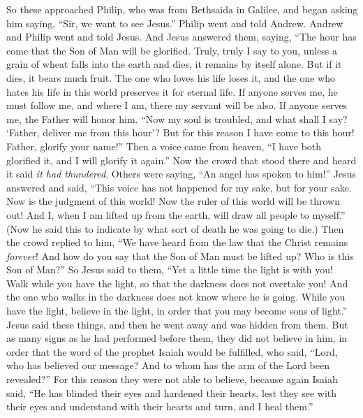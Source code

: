 \begin{biblechapter}
\verse So these approached Philip, who was from Bethsaida in Galilee, and began asking him saying, “Sir, we want to see Jesus.”
\verse Philip went and told Andrew. Andrew and Philip went and told Jesus.
\verse And Jesus answered them, saying, “The hour has come that the Son of Man will be glorified.
\verse Truly, truly I say to you, unless a grain of wheat falls into the earth and dies, it remains by itself alone. But if it dies, it bears much fruit.
\verse The one who loves his life loses it, and the one who hates his life in this world preserves it for eternal life.
\verse If anyone serves me, he must follow me, and where I am, there my servant will be also. If anyone serves me, the Father will honor him.
 “Now my soul is troubled, and what shall I say? ‘Father, deliver me from this hour’? But for this reason I have come to this hour!
\verse Father, glorify your name!” Then a voice came from heaven, “I have both glorified it, and I will glorify it again.”
\verse Now the crowd that stood there and heard it said \textit{it had thundered}. Others were saying, “An angel has spoken to him!”
\verse Jesus answered and said, “This voice has not happened for my sake, but for your sake.
\verse Now is the judgment of this world! Now the ruler of this world will be thrown out!
\verse And I, when I am lifted up from the earth, will draw all people to myself.”
\verse (Now he said this to indicate by what sort of death he was going to die.)
\verse Then the crowd replied to him, “We have heard from the law that the Christ remains \textit{forever}! And how do you say that the Son of Man must be lifted up? Who is this Son of Man?”
\verse So Jesus said to them, “Yet a little time the light is with you! Walk while you have the light, so that the darkness does not overtake you! And the one who walks in the darkness does not know where he is going.
\verse While you have the light, believe in the light, in order that you may become sons of light.” Jesus said these things, and then he went away and was hidden from them.
 But as many signs as he had performed before them, they did not believe in him,
\verse in order that the word of the prophet Isaiah would be fulfilled, who said, “Lord, who has believed our message? 
And to whom has the arm of the Lord been revealed?”
\verse For this reason they were not able to believe, because again Isaiah said,
\verse “He has blinded their eyes 
and hardened their hearts, 
lest they see with their eyes 
and understand with their hearts 
and turn, and I heal them.”

\end{biblechapter}
